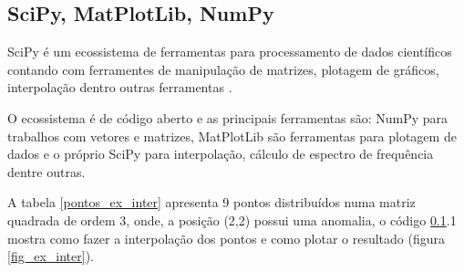             
            \subsection{SciPy, MatPlotLib, NumPy}
            \label{lim_scipy}
            
            SciPy é um ecossistema de ferramentas para processamento de dados científicos contando com ferramentes de manipulação de matrizes, plotagem de gráficos, interpolação dentro outras ferramentas \cite{scipy}.
            
            O ecossistema é de código aberto e as principais ferramentas são: NumPy para trabalhos com vetores e matrizes, MatPlotLib são ferramentas para plotagem de dados e o próprio SciPy para interpolação, cálculo de espectro de frequência dentre outras.
            
            A tabela \ref{pontos_ex_inter} apresenta 9 pontos distribuídos numa matriz quadrada de ordem 3, onde, a posição (2,2) possui uma anomalia, o código \ref{lim_scipy}.1 mostra como fazer a interpolação dos pontos e como plotar o resultado (figura \ref{fig_ex_inter}).
            
            \begin{table}[H]
                \centering
                \caption{Distribuição de pontos com valor anômalo ao centro.}
                \label{pontos_ex_inter}
            \end{table}
            

